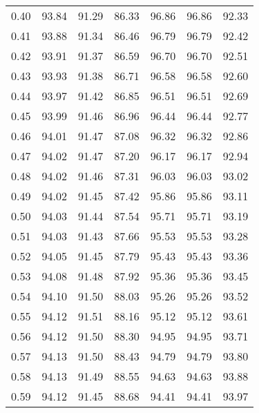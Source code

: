 \begin{tabular}{|c|c|c|c|c|c|c|}
      0.40 &     93.84 &     91.29 &      86.33 &   96.86 &      96.86 &         92.33 \\
      0.41 &     93.88 &     91.34 &      86.46 &   96.79 &      96.79 &         92.42 \\
      0.42 &     93.91 &     91.37 &      86.59 &   96.70 &      96.70 &         92.51 \\
      0.43 &     93.93 &     91.38 &      86.71 &   96.58 &      96.58 &         92.60 \\
      0.44 &     93.97 &     91.42 &      86.85 &   96.51 &      96.51 &         92.69 \\
      0.45 &     93.99 &     91.46 &      86.96 &   96.44 &      96.44 &         92.77 \\
      0.46 &     94.01 &     91.47 &      87.08 &   96.32 &      96.32 &         92.86 \\
      0.47 &     94.02 &     91.47 &      87.20 &   96.17 &      96.17 &         92.94 \\
      0.48 &     94.02 &     91.46 &      87.31 &   96.03 &      96.03 &         93.02 \\
      0.49 &     94.02 &     91.45 &      87.42 &   95.86 &      95.86 &         93.11 \\
      0.50 &     94.03 &     91.44 &      87.54 &   95.71 &      95.71 &         93.19 \\
      0.51 &     94.03 &     91.43 &      87.66 &   95.53 &      95.53 &         93.28 \\
      0.52 &     94.05 &     91.45 &      87.79 &   95.43 &      95.43 &         93.36 \\
      0.53 &     94.08 &     91.48 &      87.92 &   95.36 &      95.36 &         93.45 \\
      0.54 &     94.10 &     91.50 &      88.03 &   95.26 &      95.26 &         93.52 \\
      0.55 &     94.12 &     91.51 &      88.16 &   95.12 &      95.12 &         93.61 \\
      0.56 &     94.12 &     91.50 &      88.30 &   94.95 &      94.95 &         93.71 \\
      0.57 &     94.13 &     91.50 &      88.43 &   94.79 &      94.79 &         93.80 \\
      0.58 &     94.13 &     91.49 &      88.55 &   94.63 &      94.63 &         93.88 \\
      0.59 &     94.12 &     91.45 &      88.68 &   94.41 &      94.41 &         93.97 \\

\end{tabular}
